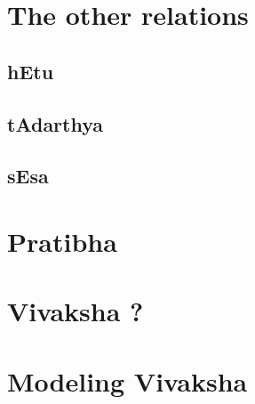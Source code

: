 \documentclass[a4paper,10pt]{article}
\begin{document}
\section{The other relations}
  \subsection{hEtu}
  \subsection{tAdarthya}
  \subsection{sEsa}
\section{Pratibha}
\newpage
\section{Vivaksha ?}
\newpage
\section{Modeling Vivaksha}
\end{document}

